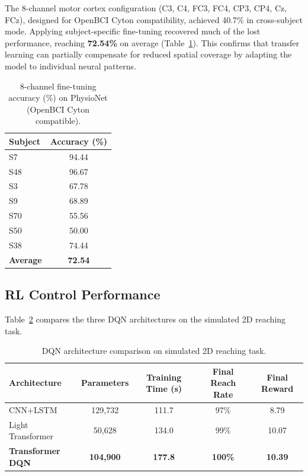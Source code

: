 \documentclass[12pt, a4paper]{article}
\begin{document}
The 8-channel motor cortex configuration (C3, C4, FC3, FC4, CP3, CP4, Cz, FCz), designed for OpenBCI Cyton compatibility, achieved 40.7\% in cross-subject mode. Applying subject-specific fine-tuning recovered much of the lost performance, reaching \textbf{72.54\%} on average (Table~\ref{tab:8ch_finetune}). This confirms that transfer learning can partially compensate for reduced spatial coverage by adapting the model to individual neural patterns.

\begin{table}[htbp]
\centering
\caption{8-channel fine-tuning accuracy (\%) on PhysioNet (OpenBCI Cyton compatible).}
\label{tab:8ch_finetune}
\begin{tabular}{lc}
\toprule
\textbf{Subject} & \textbf{Accuracy (\%)} \\
\midrule
S7  & 94.44 \\
S48 & 96.67 \\
S3  & 67.78 \\
S9  & 68.89 \\
S70 & 55.56 \\
S50 & 50.00 \\
S38 & 74.44 \\
\midrule
\textbf{Average} & \textbf{72.54} \\
\bottomrule
\end{tabular}
\end{table}

\subsection{RL Control Performance}

Table~\ref{tab:dqn_comparison} compares the three DQN architectures on the simulated 2D reaching task.

\begin{table}[htbp]
\centering
\caption{DQN architecture comparison on simulated 2D reaching task.}
\label{tab:dqn_comparison}
\begin{tabular}{lcccc}
\toprule
\textbf{Architecture} & \textbf{Parameters} & \textbf{Training Time (s)} & \textbf{Final Reach Rate} & \textbf{Final Reward} \\
\midrule
CNN+LSTM          & 129,732  & 111.7  & 97\%  & 8.79 \\
Light Transformer & 50,628   & 134.0  & 99\%  & 10.07 \\
\textbf{Transformer DQN} & \textbf{104,900} & \textbf{177.8} & \textbf{100\%} & \textbf{10.39} \\
\bottomrule
\end{tabular}
\end{table}
\end{document}

